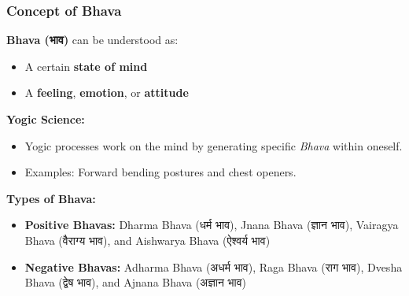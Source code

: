         
        


\begin{frame}[fragile]\frametitle{Concept of Bhava}
    \textbf{Bhava (भाव)} can be understood as:
    \begin{itemize}
        \item A certain \textbf{state of mind}
        \item A \textbf{feeling}, \textbf{emotion}, or \textbf{attitude}
    \end{itemize}

    \textbf{Yogic Science:}
    \begin{itemize}
        \item Yogic processes work on the mind by generating specific \textit{Bhava} within oneself.
        \item Examples: Forward bending postures and chest openers.
    \end{itemize}
    
    \textbf{Types of Bhava:}
    \begin{itemize}
        \item \textbf{Positive Bhavas:} Dharma Bhava (धर्म भाव), Jnana Bhava (ज्ञान भाव), Vairagya Bhava (वैराग्य भाव), and Aishwarya Bhava (ऐश्वर्य भाव)
        \item \textbf{Negative Bhavas:} Adharma Bhava (अधर्म भाव), Raga Bhava (राग भाव), Dvesha Bhava (द्वेष भाव), and Ajnana Bhava (अज्ञान भाव)
    \end{itemize}
\end{frame}


